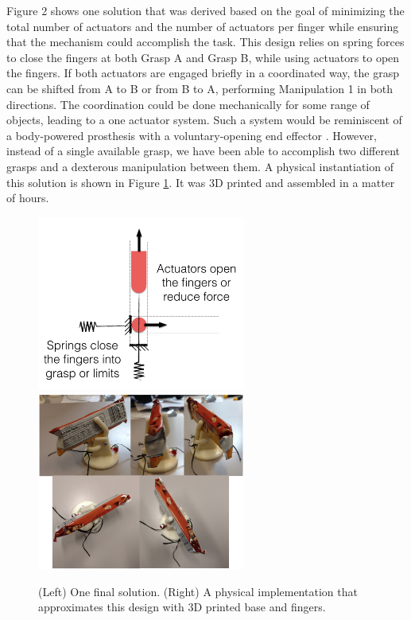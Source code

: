 Figure 2 shows one solution that was derived based on the goal of minimizing the total number of actuators and the number of actuators per finger while ensuring that the mechanism could accomplish the task.  This design relies on spring forces to close the fingers at both Grasp A and Grasp B, while using actuators to open the fingers.   If both actuators are engaged briefly in a coordinated way, the grasp can be shifted from A to B or from B to A, performing Manipulation 1 in both directions.   The coordination could be done mechanically for some range of objects, leading to a one actuator system.   Such a system would be reminiscent of a body-powered prosthesis with a voluntary-opening end effector \cite{smith2004atlas}.   However, instead of a single available grasp, we have been able to accomplish two different grasps and a dexterous manipulation between them.
A physical instantiation of this solution is shown in Figure \ref{SimpleExampleResults}.   It was 3D printed and assembled in a matter of hours.

\begin{figure}
\begin{center}
{\includegraphics[width=2.7in]{./figs/springCloseDesign.png}}
{\includegraphics[width=2.7in]{./figs/testManipulator.png}}
\end{center}
\vspace*{-0.2in}
\caption[]{\small (Left) One final solution.  (Right) A physical implementation that approximates this design with 3D printed base and fingers.}
\label{SimpleExampleResults}
\end{figure}


